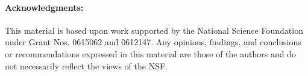 \documentclass[tfpsymp,ams,pagenumbers]{tfp05symp}
\begin{document}
\paragraph*{Acknowledgments:} This material is based upon work supported by the National Science
   Foundation under Grant Nos. 0615062 and 0612147.
Any opinions, findings, and conclusions or recommendations
   expressed in this material are those of the authors and do not
   necessarily reflect the views of the NSF.

\small

% 
% 

   
%

%
\end{document}
